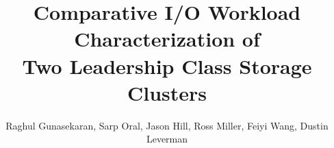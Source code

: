 \documentclass{sig-alternate}
\begin{document}
\title{Comparative I/O Workload Characterization of\\
Two Leadership Class Storage Clusters}
%
%
%
%
%

%

\author{ 
\alignauthor
Raghul Gunasekaran, Sarp Oral, Jason Hill, Ross Miller, Feiyi Wang, Dustin Leverman\\
\\
}


\maketitle



 
%
%


\nocite{reference}


\end{document}
